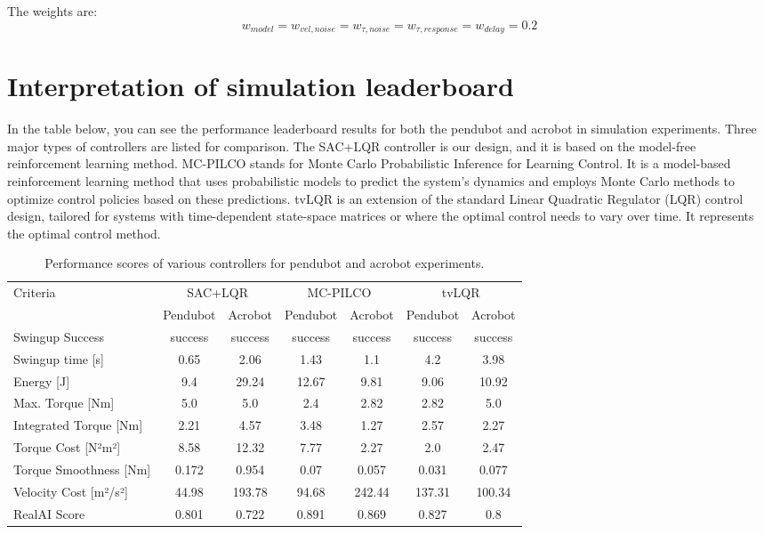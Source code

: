 The weights are:
\begin{equation}
 w_{model} = w_{vel, noise} = w_{\tau, noise} = w_{\tau, response} = w_{delay} = 0.2
\end{equation}

\section{Interpretation of simulation leaderboard}
In the table below, you can see the performance leaderboard results for both the pendubot and acrobot in simulation experiments. Three major types of controllers are listed for comparison. The SAC+LQR controller is our design, and it is based on the model-free reinforcement learning method. MC-PILCO stands for Monte Carlo Probabilistic Inference for Learning Control. It is a model-based reinforcement learning method that uses probabilistic models to predict the system's dynamics and employs Monte Carlo methods to optimize control policies based on these predictions. tvLQR is an extension of the standard Linear Quadratic Regulator (LQR) control design, tailored for systems with time-dependent state-space matrices or where the optimal control needs to vary over time. It represents the optimal control method.

\begin{table}[H]
  \centering
 \begin{tabular}{lcccccc}
 \hline
 Criteria & \multicolumn{2}{c}{SAC+LQR} & \multicolumn{2}{c}{MC-PILCO} & \multicolumn{2}{c}{tvLQR} \\
 & Pendubot & Acrobot & Pendubot & Acrobot & Pendubot & Acrobot \\
 \hline
 Swingup Success & success & success & success & success & success & success \\
 Swingup time [s] & 0.65 & 2.06 & 1.43 & 1.1 & 4.2 & 3.98 \\
 Energy [J] & 9.4 & 29.24 & 12.67 & 9.81 & 9.06 & 10.92 \\
 Max. Torque [Nm] & 5.0 & 5.0 & 2.4 & 2.82 & 2.82 & 5.0 \\
 Integrated Torque [Nm] & 2.21 & 4.57 & 3.48 & 1.27 & 2.57 & 2.27 \\
 Torque Cost [N²m²] & 8.58 & 12.32 & 7.77 & 2.27 & 2.0 & 2.47 \\
 Torque Smoothness [Nm] & 0.172 & 0.954 & 0.07 & 0.057 & 0.031 & 0.077 \\
 Velocity Cost [m²/s²] & 44.98 & 193.78 & 94.68 & 242.44 & 137.31 & 100.34 \\
 RealAI Score & 0.801 & 0.722 & 0.891 & 0.869 & 0.827 & 0.8 \\
 \hline
 \end{tabular}
 \caption{Performance scores of various controllers for pendubot and acrobot experiments.}
 \label{tab:performance}
\end{table}



